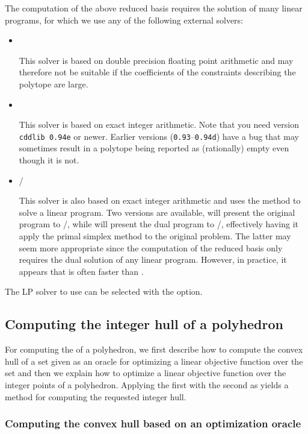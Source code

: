 The computation of the above reduced basis requires the solution
of many linear programs, for which we use any of the following
external solvers:
\begin{itemize}
\item {}~

This solver is based on double precision floating point arithmetic and
may therefore not be suitable if the coefficients of the constraints
describing the polytope are large.

\item {}~

This solver is based on exact integer arithmetic.
Note that you need version \verb+cddlib 0.94e+ or newer.
Earlier versions (\verb+0.93+--\verb+0.94d+) have
a bug that may sometimes result in a polytope being
reported as (rationally) empty even though it is not.

\item \piplib/~

This solver is also based on exact integer arithmetic
and uses the  method to solve a linear program.
Two versions are available,  will present the
original program to \piplib/, while  will present
the dual program to \piplib/, effectively having it apply the primal
simplex method to the original problem.
The latter may seem more appropriate since the computation
of the reduced basis only requires the dual solution of
any linear program.  However, in practice, it appears
that  is often faster than .
\end{itemize}
The LP solver to use can be selected with the  option.


\subsection{Computing the integer hull of a polyhedron}
\label{s:integer:hull}

For computing the  of a polyhedron,
we first describe how to compute the convex hull of a set
given as an oracle for optimizing a linear objective
function over the set and then
we explain how to optimize a linear objective function over
the integer points of a polyhedron.
Applying the first with the second as 
yields a method for computing the requested integer hull.

\subsubsection{Computing the convex hull based on an optimization oracle}

